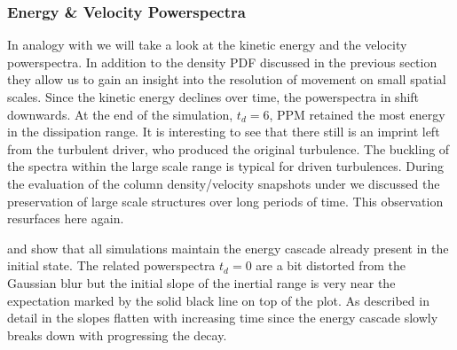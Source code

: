 \subsubsection{Energy \& Velocity Powerspectra}
In analogy with  we will take a look at the kinetic
energy and the velocity powerspectra. In addition to the density PDF discussed
in the previous section they allow us to gain an insight into the resolution
of movement on small spatial scales. Since the kinetic energy declines over
time, the powerspectra in  shift downwards.
At the end of the simulation, $t_d = 6$, PPM retained the most energy in the
dissipation range. It is interesting to see that there still is an imprint left from
the turbulent driver, who produced the original turbulence.
The buckling of the spectra within the large scale range is typical for
driven turbulences. During the evaluation of the column density/velocity snapshots
under  we discussed the preservation of large scale
structures over long periods of time. This observation resurfaces here again.

 and
 show that all simulations
maintain the energy cascade already present in the initial state. The related
powerspectra $t_d = 0$ are a bit distorted from the Gaussian blur but the
initial slope of the inertial range is very near the expectation marked by the
solid black line on top of the plot. As described in detail in
 the slopes flatten with increasing time since the energy
cascade slowly breaks down with progressing the decay.


